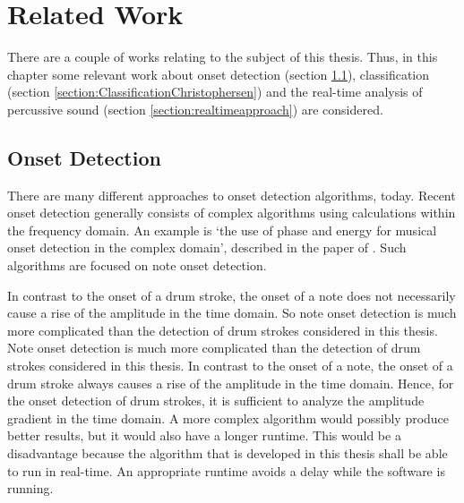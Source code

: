 \section{Related Work}
\label{section:relatedWork}


There are a couple of works relating to the subject of this thesis. Thus, in this chapter some relevant work about onset detection (section \ref{section:OnsetDetectionSchloss}), classification (section \ref{section:ClassificationChristophersen}) and the real-time analysis of percussive sound (section \ref{section:realtimeapproach}) are considered.

\subsection{Onset Detection} \label{section:OnsetDetectionSchloss}

There are many different approaches to onset detection algorithms, today. Recent onset detection generally consists of complex algorithms using calculations within the frequency domain. An example is `the use of phase and energy for musical onset detection in the complex domain', described in the paper of \autocite{Bello:2005}. Such algorithms are focused on note onset detection. 

In contrast to the onset of a drum stroke, the onset of a note does not necessarily cause a rise of the amplitude in the time domain. So note onset detection is much more complicated than the detection of drum strokes considered in this thesis. Note onset detection is much more complicated than the detection of drum strokes considered in this thesis. In contrast to the onset of a note, the onset of a drum stroke always causes a rise of the amplitude in the time domain. Hence, for the onset detection of drum strokes, it is sufficient to analyze the amplitude gradient in the time domain. A more complex algorithm would possibly produce better results, but it would also have a longer runtime. This would be a disadvantage because the algorithm that is developed in this thesis shall be able to run in real-time. An appropriate runtime avoids a delay while the software is running.

